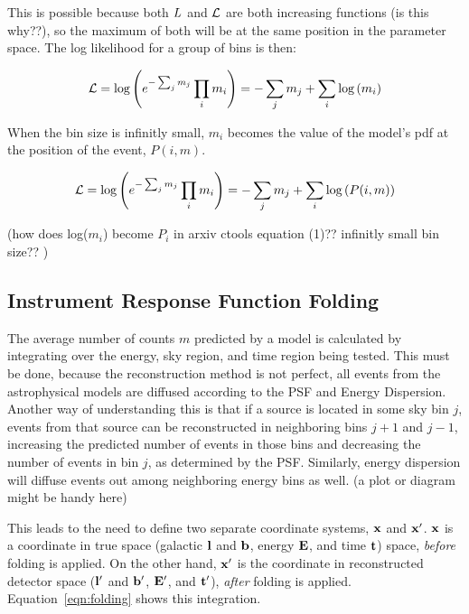   This is possible because both $L$ and $\mathcal{L}$ are both {\color{red}increasing functions (is this why??)}, so the maximum of both will be at the same position in the parameter space.
  The log likelihood for a group of bins is then:
  
  \begin{equation}\label{eqn:simple_like_7}
    \mathcal{L} = \textrm{log} \left ( e^{- \sum_j m_j} \prod_i m_i \right ) = - \sum_j m_j + \sum_i \textrm{log} \left ( m_i \right )
  \end{equation}
  
  When the bin size is infinitly small, $m_i$ becomes the value of the model's pdf at the position of the event, $P(i,m)$.
  
  \begin{equation}\label{eqn:simple_like_8}
    \mathcal{L} = \textrm{log} \left ( e^{- \sum_j m_j} \prod_i m_i \right ) = - \sum_j m_j + \sum_i \textrm{log} \left ( P(i,m) \right )
  \end{equation}
    
  
  {\color{red}(how does log($m_i$) become $P_i$ in arxiv ctools equation (1)?? infinitly small bin size?? )}
  
  \subsection{Instrument Response Function Folding}\label{subsec:folding}
  The average number of counts $m$ predicted by a model is calculated by integrating over the energy, sky region, and time region being tested.
  This must be done, because the reconstruction method is not perfect, all events from the astrophysical models are diffused according to the PSF and Energy Dispersion.
  Another way of understanding this is that if a source is located in some sky bin $j$, events from that source can be reconstructed in neighboring bins $j+1$ and $j-1$, increasing the predicted number of events in those bins and decreasing the number of events in bin $j$, as determined by the PSF.
  Similarly, energy dispersion will diffuse events out among neighboring energy bins as well.
  {\color{red}(a plot or diagram might be handy here)}

  This leads to the need to define two separate coordinate systems, $\mathbf{x }$ and $\mathbf{x'}$.
  $\mathbf{x }$ is a coordinate in true space (galactic $\mathbf{l }$ and $\mathbf{b }$, energy $\mathbf{E }$, and time $\mathbf{t }$) space, \textit{before} folding is applied.
  On the other hand, $\mathbf{x'}$ is the coordinate in reconstructed detector space ($\mathbf{l'}$ and $\mathbf{b'}$, $\mathbf{E'}$, and $\mathbf{t'}$), \textit{after} folding is applied.
  Equation~\ref{eqn:folding} shows this integration.
  
